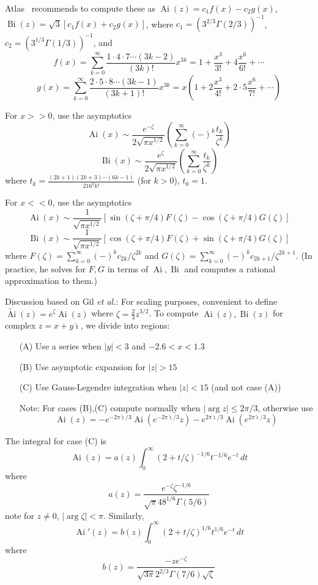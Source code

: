 \documentclass[10pt,dvipdfmx,letterpaper,twoside]{article}
\let\O=\operatorname
\newcommand{\ii}{{\hat{\imath}}}
\newenvironment{implementation}{\noindent\begin{framed}}{\end{framed}}
\let\Gam=\Gamma
\begin{document}
\begin{implementation}
Atlas~\cite{atlas:thompson} recommends to compute these as
$\O{Ai}(z) = c_1 f(x) - c_2 g(x)$, $\O{Bi}(z) = \sqrt3[c_1 f(x) + c_2 g(x)]$,
where $c_1 = (3^{2/3}\Gam(2/3))^{-1}$, $c_2 = (3^{1/3}\Gam(1/3))^{-1}$, and
\[ f(x) = \sum_{k=0}^\infty \frac{1\cdot4\cdot7\cdots(3k-2)}{(3k)!}x^{3k} = 1 + \frac{x^3}{3!} + 4\frac{x^6}{6!} + \cdots \]
\[ g(x) = \sum_{k=0}^\infty \frac{2\cdot5\cdot8\cdots(3k-1)}{(3k+1)!}x^{3k} = x(1 + 2\frac{x^3}{4!} + 2\cdot5\frac{x^6}{7!} + \cdots) \]

For $x>>0$, use the asymptotics
\[ \O{Ai}(x) \sim \frac{e^{-\zeta}}{2\sqrt{\pi x^{1/2}}}\left(\sum_{k=0}^\infty(-)^k\frac{t_k}{\zeta^k}\right) \]
\[ \O{Bi}(x) \sim \frac{e^{\zeta}}{2\sqrt{\pi x^{1/2}}}\left(\sum_{k=0}^\infty\frac{t_k}{\zeta^k}\right) \]
where $t_k = \frac{(2k+1)(2k+3)\cdots(6k-1)}{216^k k!}$ (for $k>0$), $t_0=1$.

For $x<<0$, use the asymptotics
\[ \O{Ai}(x) \sim \frac{1}{\sqrt{\pi x^{1/2}}}\left[ \sin(\zeta+\pi/4) F(\zeta) - \cos(\zeta+\pi/4) G(\zeta) \right] \]
\[ \O{Bi}(x) \sim \frac{1}{\sqrt{\pi x^{1/2}}}\left[ \cos(\zeta+\pi/4) F(\zeta) + \sin(\zeta+\pi/4) G(\zeta) \right] \]
where $F(\zeta) = \sum_{k=0}^\infty (-)^k c_{2k} / \zeta^{2k}$ and $G(\zeta) = \sum_{k=0}^\infty (-)^k c_{2k+1} / \zeta^{2k+1}$.
(In practice, he solves for $F, G$ in terms of $\O{Ai}, \O{Bi}$ and computes a rational approximation to them.)
\end{implementation}

Discussion based on Gil {\it et al.}:
For scaling purposes, convenient to define $\widetilde{\O{Ai}}(z) = e^{\zeta}\O{Ai}(z)$ where $\zeta=\frac23 z^{3/2}$.
To compute $\O{Ai}(z),\O{Bi}(z)$ for complex $z=x+y\ii$, we divide into regions:
\begin{enumerate}
  \item[(A)] Use a series when $|y|<3$ and $-2.6<x<1.3$
  \item[(B)] Use asymptotic expansion for $|z|>15$
  \item[(C)] Use Gauss-Legendre integration when $|z|<15$ (and not case (A))
  \item[Note:] For cases (B),(C) compute normally when $|\arg z|\leq2\pi/3$, otherwise use
    \[ \O{Ai}(z) = -e^{-2\pi\ii/3}\O{Ai}(e^{-2\pi\ii/3}z) -e^{2\pi\ii/3}\O{Ai}(e^{2\pi\ii/3}z) \]
\end{enumerate}
The integral for case (C) is
\[ \O{Ai}(z) = a(z) \int_0^\infty (2+t/\zeta)^{-1/6} t^{-1/6} e^{-t} \,dt \]
where
\[ a(z) = \frac{e^{-\zeta}\zeta^{-1/6}}{\sqrt{\pi} 48^{1/6} \Gam(5/6)} \]
note for $z\neq0$, $|\arg\zeta|<\pi$.
Similarly,
\[ \O{Ai}'(z) = b(z) \int_0^\infty (2+t/\zeta)^{1/6} t^{1/6} e^{-t} \,dt \]
where
\[ b(z) = \frac{-z e^{-\zeta}}{\sqrt{3\pi} 2^{2/3} \Gam(7/6)\sqrt\zeta} \]
\end{document}
